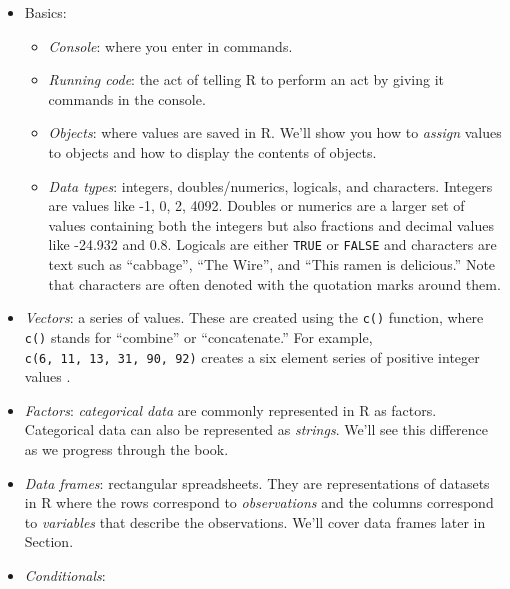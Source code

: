 \documentclass[]{book}
\providecommand{\tightlist}{%
  \setlength{\itemsep}{0pt}\setlength{\parskip}{0pt}}
\begin{document}
\begin{itemize}
\tightlist
\item
  Basics: 

  \begin{itemize}
  \tightlist
  \item
    \emph{Console}: where you enter in commands. 
  \item
    \emph{Running code}: the act of telling R to perform an act by giving it commands in the console.
  \item
    \emph{Objects}: where values are saved in R. We'll show you how to \emph{assign} values to objects and how to display the contents of objects. 
  \item
    \emph{Data types}: integers, doubles/numerics, logicals, and characters.  Integers are values like -1, 0, 2, 4092. Doubles or numerics are a larger set of values containing both the integers but also fractions and decimal values like -24.932 and 0.8. Logicals are either \texttt{TRUE} or \texttt{FALSE} and characters are text such as ``cabbage'', ``The Wire'', and ``This ramen is delicious.'' Note that characters are often denoted with the quotation marks around them.
  \end{itemize}
\item
  \emph{Vectors}: a series of values. These are created using the \texttt{c()} function, where \texttt{c()} stands for ``combine'' or ``concatenate.'' For example, \texttt{c(6,\ 11,\ 13,\ 31,\ 90,\ 92)} creates a six element series of positive integer values .
\item
  \emph{Factors}: \emph{categorical data} are commonly represented in R as factors.  Categorical data can also be represented as \emph{strings}. We'll see this difference as we progress through the book.
\item
  \emph{Data frames}: rectangular spreadsheets. They are representations of datasets in R where the rows correspond to \emph{observations} and the columns correspond to \emph{variables} that describe the observations.  We'll cover data frames later in Section.
\item
  \emph{Conditionals}:


\end{itemize}
\end{document}
